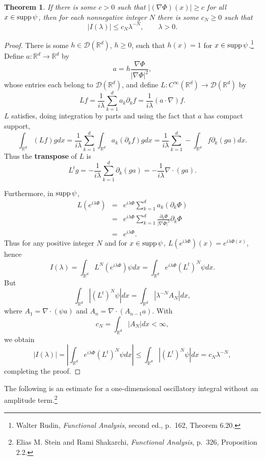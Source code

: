 \documentclass{article}
\newcommand{\supp}{\ensuremath\mathrm{supp}\,}
\newtheorem{theorem}{Theorem}
\theoremstyle{definition}
\begin{document}
\begin{theorem}
If there is some $c>0$ such that $|(\nabla \Phi)(x)| \geq c$ for all $x \in \supp \psi$, then for each nonnegative integer $N$ there is some
$c_N \geq 0$ such that
\[
|I(\lambda)| \leq c_N \lambda^{-N}, \qquad \lambda>0.
\]
\end{theorem}
\begin{proof}
There is some $h \in \mathscr{D}(\mathbb{R}^d)$, $h \geq 0$, such that $h(x)=1$ for $x \in \supp \psi$.\footnote{Walter Rudin, {\em Functional Analysis},
second ed., p.~162, Theorem 6.20.}
Define $a:\mathbb{R}^d \to \mathbb{R}^d$ by
\[
a = h \frac{\nabla \Phi}{|\nabla \Phi|^2},
\]
whose entries each belong to $\mathscr{D}(\mathbb{R}^d)$,
and define $L: C^\infty(\mathbb{R}^d) \to \mathscr{D}(\mathbb{R}^d)$ by
\[ 
Lf = \frac{1}{i\lambda} \sum_{k=1}^d a_k \partial_k f = \frac{1}{i\lambda} (a\cdot \nabla) f.
\]
$L$ satisfies, doing integration by parts and using the fact that $a$ has compact support,
\[
\int_{\mathbb{R}^d} (Lf)g dx = \frac{1}{i\lambda}  \sum_{k=1}^d \int_{\mathbb{R}^d} a_k (\partial_k f) g dx
=\frac{1}{i\lambda}  \sum_{k=1}^d -\int_{\mathbb{R}^d} f \partial_k(ga) dx.
\]
Thus the \textbf{transpose} of $L$ is
\[
L^t g = -\frac{1}{i\lambda} \sum_{k=1}^d \partial_k(ga) = -\frac{1}{i\lambda} \nabla \cdot (ga).
\]

Furthermore,  in $\supp \psi$,
\begin{eqnarray*}
L(e^{i\lambda \Phi}) &=& e^{i\lambda \Phi} \sum_{k=1}^d a_k (\partial_k \Phi)  \\
&=&  e^{i\lambda \Phi} \sum_{k=1}^d \frac{\partial_k \Phi}{|\nabla \Phi|^2} \partial_k \Phi\\
&=& e^{i\lambda \Phi}.
\end{eqnarray*}
Thus   for any positive integer $N$ and for $x \in \supp \psi$, $L(e^{i\lambda \Phi})(x) = e^{i\lambda \Phi(x)}$, hence
\[
I(\lambda) = \int_{\mathbb{R}^d} L^N(e^{i\lambda \Phi}) \psi dx = \int_{\mathbb{R}^d} e^{i\lambda \Phi} (L^t)^N \psi dx.
\]
But
\[
\int_{\mathbb{R}^d} |(L^t)^N \psi| dx = \int_{\mathbb{R}^d} | \lambda^{-N} A_N| dx,
\]
where  $A_1 = \nabla \cdot (\psi a)$ and $A_n=\nabla \cdot (A_{n-1} a)$. With
\[
c_N = \int_{\mathbb{R}^d} |A_N| dx < \infty,
\]
we obtain
\[
|I(\lambda)|
=\left|  \int_{\mathbb{R}^d} e^{i\lambda \Phi} (L^t)^N \psi dx \right|
 \leq \int_{\mathbb{R}^d} |(L^t)^N \psi| dx = c_N \lambda^{-N},
\]
completing the proof.
\end{proof}

The following is an estimate for a one-dimensional oscillatory integral without an amplitude term.\footnote{Elias
M. Stein and Rami Shakarchi, {\em Functional Analysis}, p.~326, Proposition 2.2.}
\end{document}
